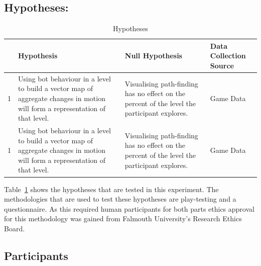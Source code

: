 \documentclass[journal]{IEEEtran}
\begin{document}
	\subsection{Hypotheses:} \label{hypothesis}
	\begin{table}[h]
		\centering
		\caption{Hypotheses}
		\label{table:Hypothesis}
		\def\arraystretch{1.5}
		\begin{tabular}{|c|p{7cm}|p{7cm}|p{1.75cm}|}
			\hline
			& \textbf{Hypothesis}& \textbf{Null Hypothesis} & \textbf{Data Collection Source} \\ \hline
			1 & Using bot behaviour in a level to build a vector map of aggregate changes in motion will form a representation of that level.
			& Visualising path-finding has no effect on the percent of the level the participant explores.
			& Game Data \\ \hline
			1 & Using bot behaviour in a level to build a vector map of aggregate changes in motion will form a representation of that level.
			& Visualising path-finding has no effect on the percent of the level the participant explores.
			& Game Data \\ \hline
			
		\end{tabular}
	\end{table}
	Table~\ref{table:Hypothesis} shows the hypotheses that are tested in this experiment. The methodologies that are used to test these hypotheses are play-testing and a questionnaire. As this required human participants for both parts ethics approval for this methodology was gained from Falmouth University’s Research Ethics Board.
	

\subsection{Participants}








\end{document}
